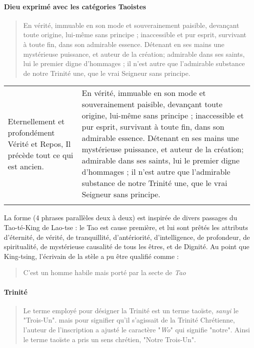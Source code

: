 \paragraph{Dieu exprimé avec les catégories Taoistes} 
\begin{quote}
    En vérité, immuable en son mode et souverainement paisible,
devançant toute origine,
lui-même sans principe ; inaccessible et
pur esprit, survivant à toute fin, dans son
admirable essence. Détenant en ses mains
une mystérieuse puissance, et auteur de la
création; admirable dans ses saints, lui le
premier digne d'hommages ; il n'est autre
que l'admirable substance de notre Trinité
une, que le vrai Seigneur sans principe.

\end{quote} 

\begin{table}[h!]
\begin{tabular}{p{5cm}p{5cm}}
Eternellement et profondément Vérité et Repos, Il précède tout ce qui est ancien. & En vérité, immuable en son mode et souverainement paisible,  devançant toute origine, lui-même sans principe ; inaccessible et  pur esprit, survivant à toute fin, dans son  admirable essence. Détenant en ses mains  une mystérieuse puissance, et auteur de la création; admirable dans ses saints, lui le  premier digne d'hommages ; il n'est autre  que l'admirable substance de notre Trinité  une, que le vrai Seigneur sans principe.  \\
                                                  &               \\
\end{tabular}
\end{table}
La forme (4 phrases parallèles deux à deux) est inspirée de divers passages du Tao-té-King de Lao-tse : le Tao est cause première,  et lui sont prêtés les attributs d'éternité, de vérité, de tranquillité, d'antériorité, d'intelligence, de profondeur, de spiritualité, de mystérieuse causalité de tous les êtres, et de Dignité. 
Au point que King-tsing, l'écrivain de la stèle a pu être qualifié comme :
\begin{quote}
    C'est un homme habile mais porté par la secte de \textit{Tao} 
\end{quote}

\paragraph{Trinité}
\begin{quote} Le terme employé pour désigner la Trinité est un terme taoïste, \emph{sanyi} le "Trois-Un". mais pour signifier qu'il s'agissait de la Trinité Chrétienne, l'auteur de l'inscription a ajusté le caractère "\emph{Wo}" qui signifie "notre". Ainsi le terme taoïste a pris un sens chrétien, "Notre Trois-Un".
    \cite[p.43]{Raguin:JesusMessieXian}
\end{quote}

